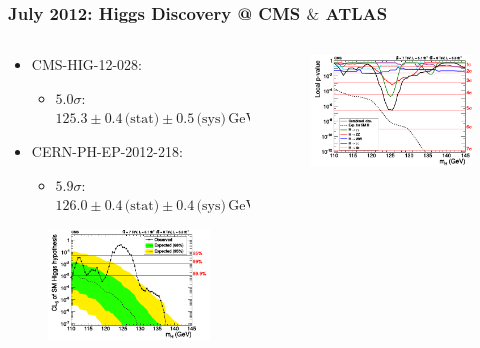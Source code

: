 \documentclass[xcolor={usenames,dvipsnames,svgnames,table}]{beamer}
\begin{document}
\begin{frame}
	\frametitle{July 2012: Higgs Discovery @ CMS $\&$ ATLAS}
	\begin{columns}
	\begin{column}{0.49\textwidth}
		\begin{itemize}
			\item CMS-HIG-12-028:
			\begin{itemize}
				\item \textcolor{color1}{$5.0\sigma$}: $ 125.3 \pm 0.4 \,\text{(stat)} \pm 0.5 \,\text{(sys)}\, \text{GeV}$
			\end{itemize}
			\item CERN-PH-EP-2012-218:
			\begin{itemize}
				\item \textcolor{color1}{$5.9\sigma$}: $ 126.0 \pm 0.4 \, \text{(stat)} \pm 0.4 \, \text{(sys)}\, \text{GeV}$
			\end{itemize}
		\end{itemize}
		\begin{figure}[t]
			\includegraphics[width=1.\textwidth]{plots/higgs_combined_cls.pdf}
		\end{figure}
	\end{column}
	\begin{column}{0.49\textwidth}
		\begin{figure}[t]
			\includegraphics[width=1.\textwidth]{plots/higgs_p_value.pdf}

\end{figure}
\end{column}
\end{columns}
\end{frame}
\end{document}
